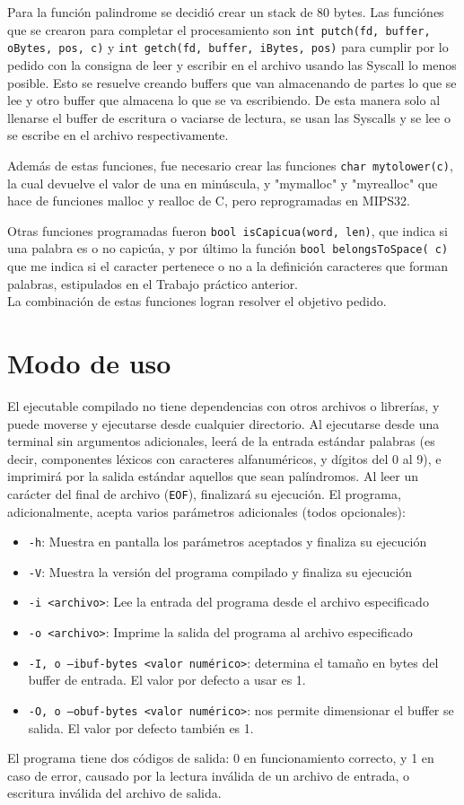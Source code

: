 \documentclass[a4paper,10pt]{article}
\begin{document}
    Para la función palindrome se decidió crear un stack de 80 bytes. 
    Las funciónes que se crearon para completar el procesamiento son \texttt{int putch(fd, buffer, oBytes, pos,  c)}  y \texttt{int getch(fd, buffer,  iBytes,  pos)} para cumplir por lo pedido con la consigna de leer y escribir en el archivo usando las Syscall lo menos posible. Esto se resuelve creando buffers que van almacenando de partes lo que se lee y otro buffer que almacena lo que se va escribiendo. De esta manera solo al llenarse el buffer de escritura o vaciarse de lectura, se usan las Syscalls y se lee o se escribe en el archivo respectivamente.
    
    Además de estas funciones, fue necesario crear las funciones \texttt{char mytolower(c)}, la cual devuelve el valor de una en minúscula, y "mymalloc" y "myrealloc" que hace de funciones malloc y realloc de C, pero reprogramadas en MIPS32.
    
    Otras funciones programadas fueron \texttt{bool isCapicua(word, len)}, que indica si una palabra es o no capicúa, y por último la función \texttt{bool belongsToSpace( c)} que me indica si el caracter pertenece o no a la definición caracteres que forman palabras, estipulados en el Trabajo práctico anterior. 
    \\
    La combinación de estas funciones logran resolver el objetivo pedido.

    \section{Modo de uso}
El ejecutable compilado no tiene dependencias con otros archivos o librerías, y puede moverse y ejecutarse desde cualquier directorio. Al ejecutarse desde una terminal sin argumentos adicionales, leerá de la entrada estándar palabras (es decir, componentes léxicos con caracteres alfanuméricos, y dígitos del 0 al 9), e imprimirá por la salida estándar aquellos que sean palíndromos. Al leer un carácter del final de archivo (\texttt{EOF}), finalizará su ejecución.
El programa, adicionalmente, acepta varios parámetros adicionales (todos opcionales):
\begin{itemize}
    \item \texttt{-h}: Muestra en pantalla los parámetros aceptados y finaliza su ejecución
    \item \texttt{-V}: Muestra la versión del programa compilado y finaliza su ejecución
    \item \texttt{-i <archivo>}: Lee la entrada del programa desde el archivo especificado
    \item \texttt{-o <archivo>}: Imprime la salida del programa al archivo especificado
    \item \texttt{-I, o --ibuf-bytes <valor numérico>}: determina el tamaño en bytes del buffer de entrada. El valor por defecto a usar es 1.
    \item \texttt{-O, o --obuf-bytes <valor numérico>}: nos permite dimensionar el buffer se salida. El valor por defecto también es 1.
\end{itemize}
El programa tiene dos códigos de salida: 0 en funcionamiento correcto, y 1 en caso de error, causado por la lectura inválida de un archivo de entrada, o escritura inválida del archivo de salida.
\end{document}
